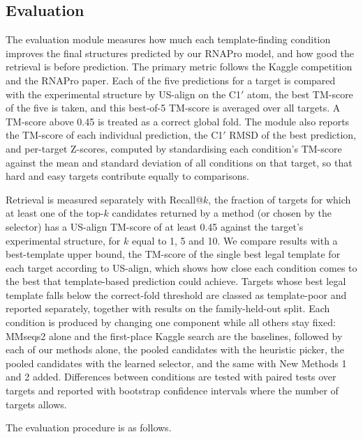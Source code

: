 \documentclass{FastFyp}
\begin{document}
\subsection{Evaluation}
\label{sec:impl-eval}
The evaluation module measures how much each template-finding condition improves the final structures predicted by our RNAPro model, and how good the retrieval is before prediction. The primary metric follows the Kaggle competition and the RNAPro paper. Each of the five predictions for a target is compared with the experimental structure by US-align on the C1$'$ atom, the best TM-score of the five is taken, and this best-of-5 TM-score is averaged over all targets. A TM-score above 0.45 is treated as a correct global fold. The module also reports the TM-score of each individual prediction, the C1$'$ RMSD of the best prediction, and per-target Z-scores, computed by standardising each condition's TM-score against the mean and standard deviation of all conditions on that target, so that hard and easy targets contribute equally to comparisons.

Retrieval is measured separately with Recall@$k$, the fraction of targets for which at least one of the top-$k$ candidates returned by a method (or chosen by the selector) has a US-align TM-score of at least 0.45 against the target's experimental structure, for $k$ equal to 1, 5 and 10. We compare results with a best-template upper bound, the TM-score of the single best legal template for each target according to US-align, which shows how close each condition comes to the best that template-based prediction could achieve. Targets whose best legal template falls below the correct-fold threshold are classed as template-poor and reported separately, together with results on the family-held-out split. Each condition is produced by changing one component while all others stay fixed: MMseqs2 alone and the first-place Kaggle search are the baselines, followed by each of our methods alone, the pooled candidates with the heuristic picker, the pooled candidates with the learned selector, and the same with New Methods 1 and 2 added. Differences between conditions are tested with paired tests over targets and reported with bootstrap confidence intervals where the number of targets allows.

The evaluation procedure is as follows.
\end{document}

